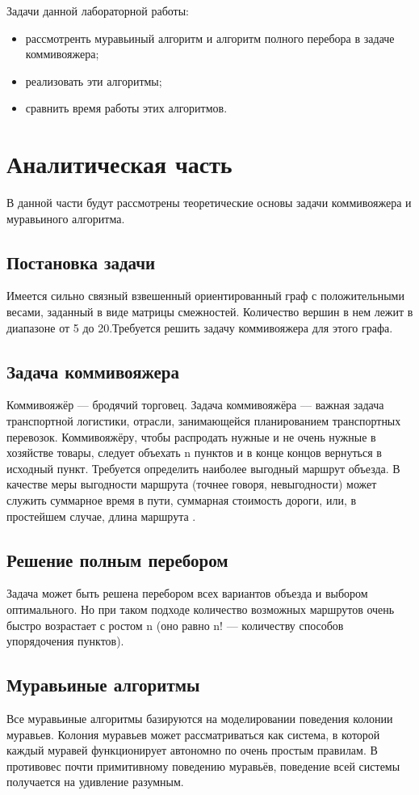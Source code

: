 \documentclass[12pt]{report}
\begin{document}
Задачи данной лабораторной работы:
\begin{itemize}
	\item рассмотренть муравьиный алгоритм и алгоритм полного перебора в задаче коммивояжера;
	\item реализовать эти алгоритмы;
	\item сравнить время работы этих алгоритмов.
\end{itemize}



\chapter{Аналитическая часть}
В данной части будут рассмотрены теоретические основы задачи коммивояжера и муравьиного алгоритма. 

\section{Постановка задачи} 
Имеется сильно связный взвешенный ориентированный граф с положительными весами, заданный в виде матрицы смежностей. Количество вершин в нем лежит в диапазоне от 5 до 20.Требуется решить задачу коммивояжера для этого графа\cite{diskr}. 

\section{Задача коммивояжера}
Коммивояжёр — бродячий торговец. Задача коммивояжёра — важная задача транспортной логистики, отрасли, занимающейся планированием транспортных перевозок. Коммивояжёру, чтобы распродать нужные и не очень нужные в хозяйстве товары, следует объехать n пунктов и в конце концов вернуться в исходный пункт. Требуется определить наиболее выгодный маршрут объезда. В качестве меры выгодности маршрута (точнее говоря, невыгодности) может служить суммарное время в пути, суммарная стоимость дороги, или, в простейшем случае, длина маршрута \cite{commi2}.

\section{Решение полным перебором}
Задача может быть решена перебором всех вариантов объезда и выбором оптимального. Но при таком подходе количество возможных маршрутов очень быстро возрастает с ростом n (оно равно n! — количеству способов упорядочения пунктов).

\section{Муравьиные алгоритмы}
Все муравьиные алгоритмы базируются на моделировании поведения колонии муравьев. Колония муравьев может рассматриваться как система, в которой каждый муравей функционирует автономно по очень простым правилам. В противовес почти примитивному поведению муравьёв, поведение всей системы получается на удивление разумным.
\end{document}
